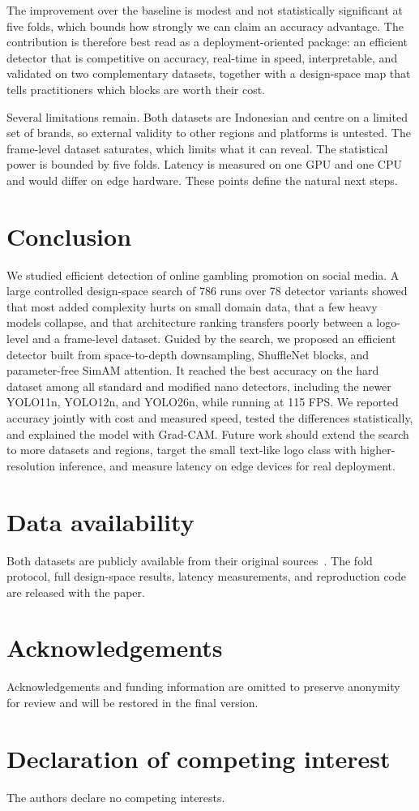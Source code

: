 \documentclass[preprint,review,12pt]{elsarticle}
\begin{document}
The improvement over the baseline is modest and not statistically significant at
five folds, which bounds how strongly we can claim an accuracy advantage. The
contribution is therefore best read as a deployment-oriented package: an
efficient detector that is competitive on accuracy, real-time in speed,
interpretable, and validated on two complementary datasets, together with a
design-space map that tells practitioners which blocks are worth their cost.

Several limitations remain. Both datasets are Indonesian and centre on a limited
set of brands, so external validity to other regions and platforms is untested.
The frame-level dataset saturates, which limits what it can reveal. The
statistical power is bounded by five folds. Latency is measured on one GPU and
one CPU and would differ on edge hardware. These points define the natural next
steps.

\section{Conclusion}
We studied efficient detection of online gambling promotion on social media. A
large controlled design-space search of 786 runs over 78 detector variants showed
that most added complexity hurts on small domain data, that a few heavy models
collapse, and that architecture ranking transfers poorly between a logo-level and
a frame-level dataset. Guided by the search, we proposed an efficient detector
built from space-to-depth downsampling, ShuffleNet blocks, and parameter-free
SimAM attention. It reached the best accuracy on the hard dataset among all
standard and modified nano detectors, including the newer YOLO11n, YOLO12n, and
YOLO26n, while running at 115 FPS. We reported accuracy jointly with cost and
measured speed, tested the differences statistically, and explained the model
with Grad-CAM. Future work should extend the search to more datasets and
regions, target the small text-like logo class with higher-resolution inference,
and measure latency on edge devices for real deployment.

\section*{Data availability}
Both datasets are publicly available from their original
sources~\cite{dataset_v21_roboflow, dataset_judi3k_kaggle}. The fold protocol,
full design-space results, latency measurements, and reproduction code are
released with the paper.

\section*{Acknowledgements}
Acknowledgements and funding information are omitted to preserve anonymity for
review and will be restored in the final version.

\section*{Declaration of competing interest}
The authors declare no competing interests.



\end{document}
